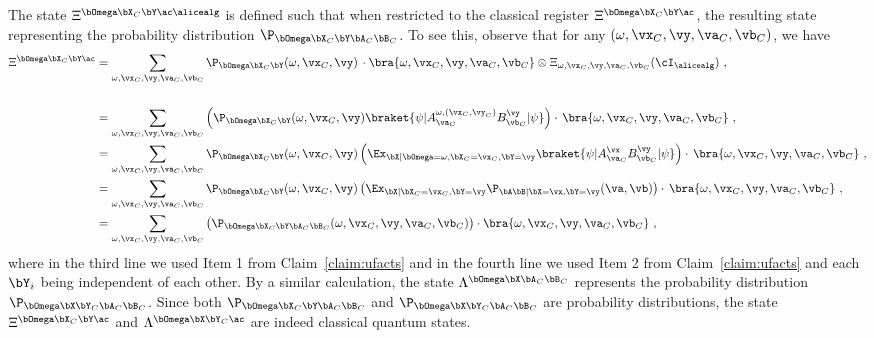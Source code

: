 The state $\Xi^{\bOmega \bX_C \bY \ac \alicealg}$ is defined such that when restricted to the classical register $\Xi^{\bOmega \bX_C \bY \ac}$, the resulting state representing the probability distribution $\P_{\bOmega \bX_C \bY \bA_C \bB_C}$. To see this, observe that for any $(\omega,\vx_C, \vy,  \va_C, \vb_C)$, we have
\begin{align*}
	\Xi^{\bOmega \bX_C \bY \ac} &= \sum_{\omega, \vx_C,\vy, \va_C, \vb_C} \P_{\bOmega \bX_C \bY}   (\omega,\vx_C, \vy) \, \cdot \bra{\omega, \vx_C, \vy, \va_C, \vb_C} \otimes \Xi_{\omega,\vx_C, \vy,\va_C,\vb_C}(\cI_{\alicealg}) ~,   \\ \\
	&= \sum_{\omega, \vx_C,\vy, \va_C, \vb_C} \left(\P_{\bOmega \bX_C \bY}  (\omega,\vx_C, \vy)  \braket{\psi| A^{\omega, (\vx_C, \vy_C)}_{\va_C} B^\vy_{\vb_C}|\psi  } \right) \cdot  \, \bra{\omega, \vx_C, \vy, \va_C, \vb_C}  ~,    \\
	&= \sum_{\omega, \vx_C,\vy, \va_C, \vb_C}\P_{\bOmega \bX_C \bY}  (\omega,\vx_C, \vy)   \left( \Ex_{\bX | \bOmega = \omega, \bX_C = \vx_C,\bY= \vy} \braket{\psi|  A^{\vx}_{\va_C}  B^\vy_{\vb_C}|\psi} \right)  \cdot  \, \bra{\omega, \vx_C, \vy, \va_C, \vb_C}  ~,    \\
	&= \sum_{\omega, \vx_C,\vy, \va_C, \vb_C}\P_{\bOmega \bX_C \bY}  (\omega,\vx_C, \vy)  \left(  \Ex_{\bX | \bX_C = \vx_C,\bY= \vy} \P_{\bA \bB | \bX = \vx, \bY = \vy}(\va,\vb) \right)  \cdot  \, \bra{\omega, \vx_C, \vy, \va_C, \vb_C}  ~,    \\
	&= \sum_{\omega, \vx_C,\vy, \va_C, \vb_C}  \left( \P_{\bOmega \bX_C \bY \bA_C \bB_C}  (\omega,\vx_C, \vy, \va_C, \vb_C) \right)  \cdot  \bra{\omega, \vx_C, \vy, \va_C, \vb_C}  ~,    
\end{align*}
where in the third line we used Item 1 from Claim~\ref{claim:ufacts} and in the fourth line we used Item 2 from Claim~\ref{claim:ufacts} and each $\bY_i$ being independent of each other. By a similar calculation, the state $\Lambda^{\bOmega \bX \bA_C \bB_C}$ represents the probability distribution $\P_{\bOmega \bX \bY_C \bA_C \bB_C}$. Since both $\P_{\bOmega \bX_C \bY \bA_C \bB_C}$ and $\P_{\bOmega \bX \bY_C \bA_C \bB_C}$ are probability distributions, the state $\Xi^{\bOmega \bX_C \bY \ac} $ and $\Lambda^{\bOmega \bX \bY_C \ac}$ are indeed classical quantum states. 


